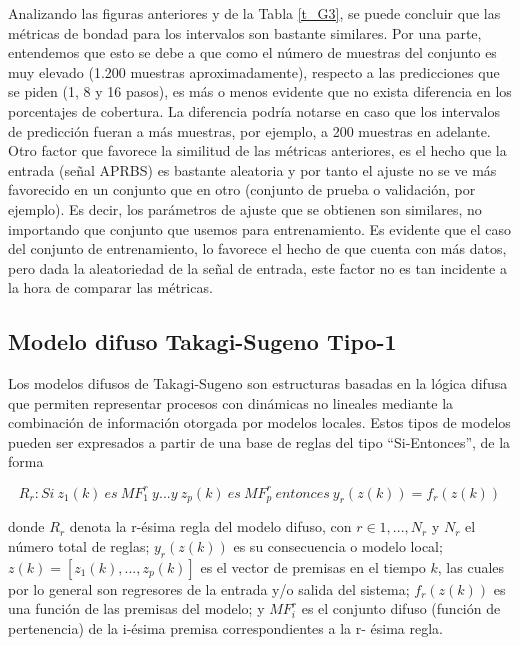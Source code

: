 \documentclass[12pt]{article}
\begin{document}
Analizando las figuras anteriores y de la Tabla \ref{t_G3}, se puede concluir que las métricas de bondad para los intervalos son bastante similares. Por una parte, entendemos que esto se debe a que como el número de muestras del conjunto es muy elevado (1.200 muestras aproximadamente), respecto a las predicciones que se piden (1, 8 y 16 pasos), es más o menos evidente que no exista diferencia en los porcentajes de cobertura. La diferencia podría notarse en caso que los intervalos de predicción fueran a más muestras, por ejemplo, a 200 muestras en adelante.  Otro factor que favorece la similitud de las métricas anteriores, es el hecho que la entrada (señal APRBS) es bastante aleatoria y por tanto el ajuste no se ve más favorecido en un conjunto que en otro (conjunto de prueba o validación, por ejemplo).  Es decir, los parámetros de ajuste que se obtienen son similares, no importando que conjunto que usemos para entrenamiento.  Es evidente que el caso del conjunto de entrenamiento, lo favorece el hecho de que cuenta con más datos, pero dada la aleatoriedad de la señal de entrada, este factor no es tan incidente a la hora de comparar las métricas.

\newpage

\subsection{Modelo difuso Takagi-Sugeno Tipo-1}

Los modelos difusos de Takagi-Sugeno son estructuras basadas en la lógica difusa
que permiten representar procesos con dinámicas no lineales mediante la combinación
de información otorgada por modelos locales. Estos tipos de modelos pueden ser
expresados a partir de una base de reglas del tipo “Si-Entonces”, de la forma

\begin{equation}
R_r: Si\:z_1(k)\:es\:MF_1^r\:y ... y \: z_p(k)\:es\:MF_p^r\:entonces \:y_r(z(k))=f_r(z(k))
\label{e_TS}
\end{equation}

donde $R_r$ denota la r-ésima regla del modelo difuso, con $r\in{1,...,N_r}$ y $N_r$ el número
total de reglas; $y_r(z(k))$ es su consecuencia o modelo local; $z(k)=[z_1(k),...,z_p(k)]$ es el
vector de premisas en el tiempo $k$, las cuales por lo general son regresores de la entrada
y/o salida del sistema; $f_r(z(k))$ es una función de las premisas del modelo; y $MF_i^r$ es el
conjunto difuso (función de pertenencia) de la i-ésima premisa correspondientes a la r-
ésima regla.
\end{document}
